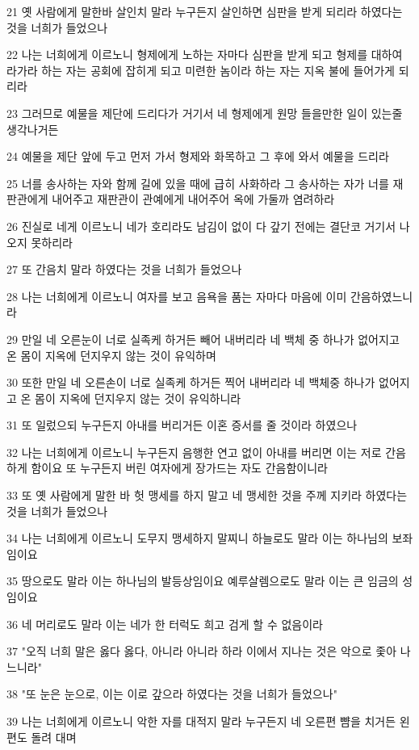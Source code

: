 \par 21 옛 사람에게 말한바 살인치 말라 누구든지 살인하면 심판을 받게 되리라 하였다는 것을 너희가 들었으나
\par 22 나는 너희에게 이르노니 형제에게 노하는 자마다 심판을 받게 되고 형제를 대하여 라가라 하는 자는 공회에 잡히게 되고 미련한 놈이라 하는 자는 지옥 불에 들어가게 되리라
\par 23 그러므로 예물을 제단에 드리다가 거기서 네 형제에게 원망 들을만한 일이 있는줄 생각나거든
\par 24 예물을 제단 앞에 두고 먼저 가서 형제와 화목하고 그 후에 와서 예물을 드리라
\par 25 너를 송사하는 자와 함께 길에 있을 때에 급히 사화하라 그 송사하는 자가 너를 재판관에게 내어주고 재판관이 관예에게 내어주어 옥에 가둘까 염려하라
\par 26 진실로 네게 이르노니 네가 호리라도 남김이 없이 다 갚기 전에는 결단코 거기서 나오지 못하리라
\par 27 또 간음치 말라 하였다는 것을 너희가 들었으나
\par 28 나는 너희에게 이르노니 여자를 보고 음욕을 품는 자마다 마음에 이미 간음하였느니라
\par 29 만일 네 오른눈이 너로 실족케 하거든 빼어 내버리라 네 백체 중 하나가 없어지고 온 몸이 지옥에 던지우지 않는 것이 유익하며
\par 30 또한 만일 네 오른손이 너로 실족케 하거든 찍어 내버리라 네 백체중 하나가 없어지고 온 몸이 지옥에 던지우지 않는 것이 유익하니라
\par 31 또 일렀으되 누구든지 아내를 버리거든 이혼 증서를 줄 것이라 하였으나
\par 32 나는 너희에게 이르노니 누구든지 음행한 연고 없이 아내를 버리면 이는 저로 간음하게 함이요 또 누구든지 버린 여자에게 장가드는 자도 간음함이니라
\par 33 또 옛 사람에게 말한 바 헛 맹세를 하지 말고 네 맹세한 것을 주께 지키라 하였다는 것을 너희가 들었으나
\par 34 나는 너희에게 이르노니 도무지 맹세하지 말찌니 하늘로도 말라 이는 하나님의 보좌임이요
\par 35 땅으로도 말라 이는 하나님의 발등상임이요 예루살렘으로도 말라 이는 큰 임금의 성임이요
\par 36 네 머리로도 말라 이는 네가 한 터럭도 희고 검게 할 수 없음이라
\par 37 "오직 너희 말은 옳다 옳다, 아니라 아니라 하라 이에서 지나는 것은 악으로 좇아 나느니라"
\par 38 "또 눈은 눈으로, 이는 이로 갚으라 하였다는 것을 너희가 들었으나"
\par 39 나는 너희에게 이르노니 악한 자를 대적지 말라 누구든지 네 오른편 뺨을 치거든 왼편도 돌려 대며
